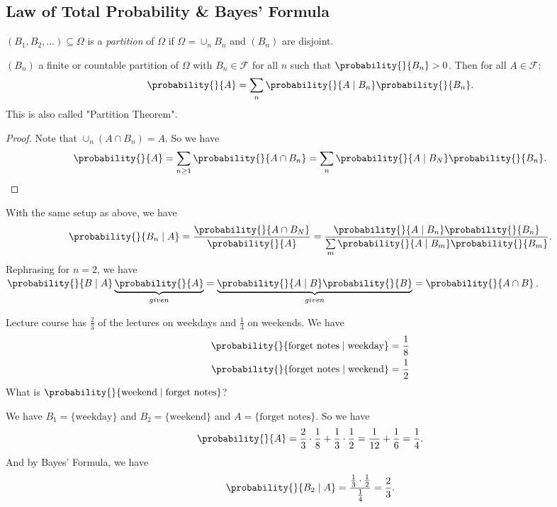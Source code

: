 \subsection{Law of Total Probability \& Bayes' Formula}
\leavevmode
\begin{definition}
    \((B_1, B_2, \ldots) \subseteq \Omega\) is a \textit{partition} of \(\Omega\) if \(\Omega = \cup_n B_n\) and \((B_n)\) are disjoint.
\end{definition}
\begin{theorem}
    \((B_n)\) a finite or countable partition of \(\Omega\) with \(B_n \in \mathcal{F} \) for all \(n\) such that \(\probability{}{B_n} >0\). Then for all \(A \in \mathcal{F} \):
    \[
        \probability{}{A} = \sum\limits_{n}\probability{}{A\mid B_n} \probability{}{B_n} .
    \]
    This is also called "Partition Theorem".
\end{theorem}
\begin{proof}
    Note that \(\cup_n (A\cap B_n) = A\). So we have
    \[
        \probability{}{A} = \sum\limits_{n\geq 1}\probability{}{A\cap B_n} = \sum\limits_{n} \probability{}{A\mid B_N} \probability{}{B_n}.
    \]
\end{proof}
\begin{theorem}
    With the same setup as above, we have
    \[
        \probability{}{B_n \mid A} = \frac{\probability{}{A \cap B_N}}{\probability{}{A} }= \frac{\probability{}{A\mid B_n} \probability{}{B_n} }{\sum\limits_{m}\probability{}{A\mid B_m} \probability{}{B_m} }.
    \]
    Rephrasing for \(n = 2\), we have \(\probability{}{B \mid A} \underbrace{\probability{}{A}}_{given} = \underbrace{\probability{}{A \mid B} \probability{}{B}}_{given} = \probability{}{A\cap B}\).
\end{theorem}
\begin{example}
    Lecture course has \(\frac{2}{3}\) of the lectures on weekdays and \(\frac{1}{3}\) on weekends. We have
    \begin{align*}
        \probability{}{\text{forget notes}\mid \text{weekday}} &= \frac{1}{8}\\ 
        \probability{}{\text{forget notes}\mid \text{weekend}} &= \frac{1}{2}
    \end{align*}
    What is \(\probability{}{\text{weekend}\mid \text{forget notes}} \)?

    We have \(B_1 = \{\text{weekday}\}\) and \(B_2 = \{\text{weekend}\}\) and \(A = \{\text{forget notes}\}\). So we have
    \[
        \probability{}{A} = \frac{2}{3}\cdot\frac{1}{8}+\frac{1}{3}\cdot\frac{1}{2} = \frac{1}{12} + \frac{1}{6}=\frac{1}{4}.
    \]
    And by Bayes' Formula, we have
    \[
        \probability{}{B_2 \mid A} = \frac{\frac{1}{3}\cdot \frac{1}{2}}{\frac{1}{4}} = \frac{2}{3}.
    \]
\end{example}
